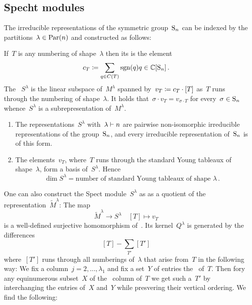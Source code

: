 \documentclass[a4paper,10pt]{scrartcl}
\begin{document}
\subsection{Specht modules}

The irreducible representations of the symmetric group~$\operatorname{S}_n$ can be indexed by the partitions~$\lambda \in \operatorname{Par}(n)$ and constructed as follows:

If~$T$ is any numbering of shape~$\lambda$ then its  is the element
\[
  c_T
  \coloneqq
  \sum_{q \in C(T)} \operatorname{sgn}(q) q
  \in
  \mathbb{C}[\operatorname{S}_n] \,.
\]
The ~$S^{\lambda}$ is the linear subspace of~$M^{\lambda}$ spanned by~$v_T \coloneqq c_T \cdot [T]$ as~$T$ runs through the numbering of shape~$\lambda$.
It holds that~$\sigma \cdot v_T = v_{\sigma \cdot T}$ for every~$\sigma \in \operatorname{S}_n$ whence~$S^\lambda$ is a subrepresentation of~$M^\lambda$.

\begin{theorem}
  \label{irreps of sn}
  \leavevmode
  \begin{enumerate}
    \item
      The representations~$S^\lambda$ with~$\lambda \vdash n$ are pairwise non-isomorphic irreducible representations of the group~$\operatorname{S}_n$, and every irreducible representation of~$\operatorname{S}_n$ is of this form.
    \item
      The elements~$v_T$, where~$T$ runs through the standard Young tableaux of shape~$\lambda$, form a basis of~$S^\lambda$.
      Hence
      \[
        \dim S^\lambda
        =
        \text{number of standard Young tableaux of shape~$\lambda$} \,.
      \]
  \end{enumerate}
\end{theorem}

One can also construct the Spect module~$S^{\lambda}$ as as a quotient of the representation~$\widetilde{M}^\lambda$:
The map
\[
  \widetilde{M}^\lambda
  \to
  S^\lambda
  \quad
  [T]
  \mapsto
  v_T
\]
is a well-defined surjective homomorphism of~{}.
Its kernel~$Q^\lambda$ is generated by the differences
\[
  [T] - \sum_{T'} [T']
\]
where~$[T']$ runs through all numberings of~$\lambda$ that arise from~$T$ in the following way:
We fix a column~$j = 2, \dotsc, \lambda_1$ and fix a set~$Y$ of entries the~{} of~$T$.
Then fory any equinumerous subset~$X$ of the~{} column of~$T$ we get such a~$T'$ by interchanging the entries of~$X$ and~$Y$ while presvering their vertical ordering.
We find the following:
\end{document}
